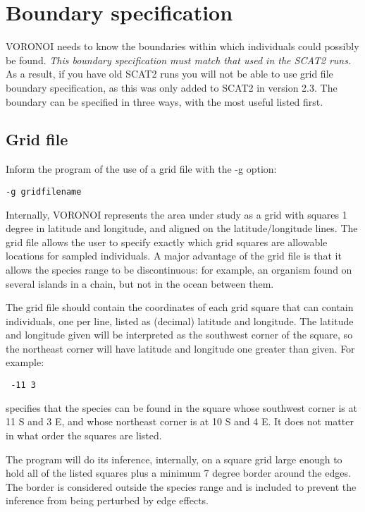 \documentclass[10pt,titlepage,times,letterpaper]{article}
\begin{document}
\section{Boundary specification}

VORONOI needs to know the boundaries within which individuals could possibly be found. {\it This boundary
specification must match that used in the SCAT2 runs.}  As a result, if you have old SCAT2 runs you
will not be able to use grid file boundary specification, as this was only added to SCAT2 in version 2.3.
The boundary can be specified in three ways, with the most useful listed first.

\subsection{Grid file}

Inform the program of the use of a grid file with the -g option:

{\tt -g gridfilename}

Internally, VORONOI represents the area under study as a grid with squares 1 degree in latitude
and longitude, and aligned on the latitude/longitude lines.  The grid file allows the user to
specify exactly which grid squares are allowable locations for sampled individuals.  A major
advantage of the grid file is that it allows the species range to be discontinuous:  for example, 
an organism found on several islands in a chain, but not in the ocean between them. 

The grid file should contain the coordinates of each grid square that can contain individuals,
one per line, listed as (decimal) latitude and longitude. 
The latitude and longitude given will be interpreted as the southwest
corner of the square, so the northeast corner will have latitude and longitude 
one greater than given.  For example:

{\noindent
{\tt
-11 3 \\
}}

specifies that the species can be found in the square whose southwest corner is at 11 S and 3 E,
and whose northeast corner is at 10 S and 4 E.  It does not matter in what order the squares are listed.

The program will do its inference, internally, on a square grid large enough to hold all of the
listed squares plus a minimum 7 degree border around the edges.   The border is considered outside the
species range and is included to prevent the inference from being perturbed by
edge effects.
\end{document}
